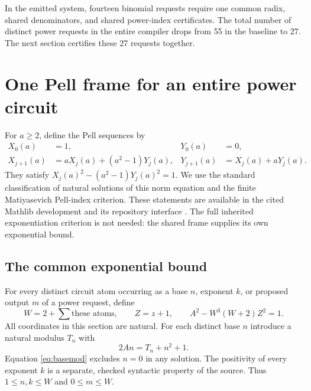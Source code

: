\documentclass[11pt,letterpaper]{article}
\theoremstyle{definition}\newtheorem{definition}[theorem]{Definition}
\theoremstyle{remark}\newtheorem{remark}[theorem]{Remark}
\begin{document}
In the emitted system, fourteen binomial requests require one common radix,
shared denominators, and shared power-index certificates. The total number
of distinct power requests in the entire compiler drops from 55 in the
baseline to 27. The next section certifies these 27 requests together.

\section{One Pell frame for an entire power circuit}
\label{sec:power}

For $a\ge2$, define the Pell sequences by
\begin{align*}
 X_0(a)&=1,&Y_0(a)&=0,\\
 X_{j+1}(a)&=aX_j(a)+(a^2-1)Y_j(a),&
 Y_{j+1}(a)&=X_j(a)+aY_j(a).
\end{align*}
They satisfy $X_j(a)^2-(a^2-1)Y_j(a)^2=1$. We use the standard
classification of natural solutions of this norm equation and the finite
Matiyasevich Pell-index criterion. These statements are available in the
cited Mathlib development and its repository interface
\cite{pell,carneiro,pellinterface}. The full inherited exponentiation
criterion is not needed: the shared frame supplies its own exponential bound.

\subsection{The common exponential bound}

For every distinct circuit atom occurring as a base $n$, exponent $k$, or
proposed output $m$ of a power request, define
\begin{equation}\label{eq:frame}
 W=2+\sum\text{these atoms},\qquad Z=z+1,\qquad
 A^2-W^3(W+2)Z^2=1.
\end{equation}
All coordinates in this section are natural. For each distinct base $n$
introduce a natural modulus $T_n$ with
\begin{equation}\label{eq:basemod}
 2An=T_n+n^2+1.
\end{equation}
Equation \eqref{eq:basemod} excludes $n=0$ in any solution. The
positivity of every exponent $k$ is a separate, checked syntactic property
of the source. Thus $1\le n,k\le W$ and $0\le m\le W$.
\end{document}
